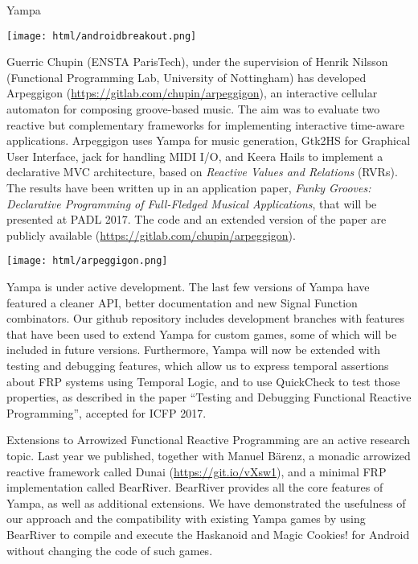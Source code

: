 \begin{hcarentry}[updated]{Yampa}
\begin{center}
\texttt{[image: html/androidbreakout.png]}
\end{center}

Guerric Chupin (ENSTA ParisTech), under the supervision of Henrik Nilsson
(Functional Programming Lab, University of Nottingham) has developed Arpeggigon
(\href{https://gitlab.com/chupin/arpeggigon}{https://gitlab.com/chupin/arpeggigon}),
an interactive cellular automaton for composing groove-based music. The aim was
to evaluate two reactive but complementary frameworks for implementing
interactive time-aware applications. Arpeggigon uses Yampa for music
generation, Gtk2HS for Graphical User Interface, jack for handling MIDI I/O,
and Keera Hails to implement a declarative MVC architecture, based on
\emph{Reactive Values and Relations} (RVRs).  The results have been written up
in an application paper, \emph{Funky Grooves: Declarative Programming of
Full-Fledged Musical Applications}, that will be presented at PADL 2017. The
code and an extended version of the paper are publicly available
(\href{https://gitlab.com/chupin/arpeggigon}{https://gitlab.com/chupin/arpeggigon}).

\begin{center}
  \texttt{[image: html/arpeggigon.png]}
\end{center}

Yampa is under active development. The last few versions of Yampa have featured
a cleaner API, better documentation and new Signal Function combinators. Our
github repository includes development branches with features that have been
used to extend Yampa for custom games, some of which will be included in future
versions. Furthermore, Yampa will now be extended with testing and debugging
features, which allow us to express temporal assertions about FRP systems using
Temporal Logic, and to use QuickCheck to test those properties, as described in
the paper ``Testing and Debugging Functional Reactive Programming'', accepted
for ICFP 2017.

Extensions to Arrowized Functional Reactive Programming are an active research
topic. Last year we published, together with Manuel B\"arenz, a monadic
arrowized reactive framework called Dunai
(\href{https://git.io/vXsw1}{https://git.io/vXsw1}), and a minimal FRP
implementation called BearRiver. BearRiver provides all the core features of
Yampa, as well as additional extensions. We have demonstrated the usefulness of
our approach and the compatibility with existing Yampa games by using BearRiver
to compile and execute the Haskanoid and Magic Cookies! for Android without
changing the code of such games.


\end{hcarentry}
